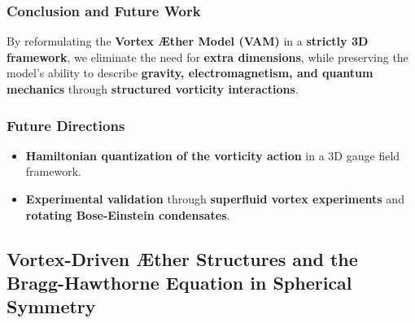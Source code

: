 \documentclass[a4paper,10pt]{article}
\begin{document}
    \subsubsection*{Conclusion and Future Work}
    By reformulating the \textbf{Vortex Æther Model (VAM)} in a \textbf{strictly 3D framework}, we eliminate the need for \textbf{extra dimensions}, while preserving the model's ability to describe \textbf{gravity, electromagnetism, and quantum mechanics} through \textbf{structured vorticity interactions}.

    \subsubsection*{Future Directions}
    \begin{itemize}
        \item \textbf{Hamiltonian quantization of the vorticity action} in a 3D gauge field framework.
        \item \textbf{Experimental validation} through \textbf{superfluid vortex experiments} and \textbf{rotating Bose-Einstein condensates}.
    \end{itemize}
    


    
\subsection{Vortex-Driven Æther Structures and the Bragg-Hawthorne Equation in Spherical Symmetry}
\begin{abstract}
This paper derives the equilibrium dynamics of vortex-driven Æther structures using the Bragg-Hawthorne equation in spherical symmetry. The objective is to establish a non-viscous liquid Æther theory, wherein inertia emerges as a property of vortex circulation. By incorporating helicity conservation and the proposed fundamental constants, we provide a mathematical framework for understanding mass, motion, and their experimental implications. Additionally, we demonstrate how Newtonian gravity naturally emerges in the low-vorticity limit, linking classical mechanics to structured vorticity fields. We further explore the interplay between vorticity-induced gravitational analogs and observable cosmological phenomena, expanding the theoretical framework towards large-scale structures.
\end{abstract}
\end{document}
